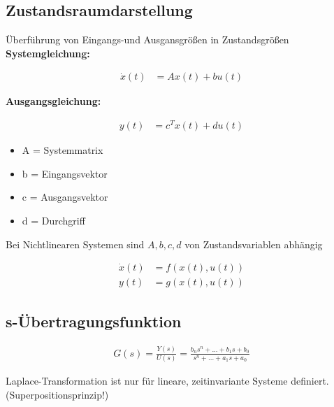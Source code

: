 \documentclass[10pt,a4paper]{article}
\begin{document}
  \subsection{Zustandsraumdarstellung}
  Überführung von Eingangs-und Ausgansgrößen in Zustandsgrößen \\
\textbf{Systemgleichung:}
  \begin{mdframed}[style=exercise]
    \begin{align}
        \dot{x}(t) &= Ax(t) + bu(t)
    \end{align}
  \end{mdframed}
\textbf{Ausgangsgleichung:}
  \begin{mdframed}[style=exercise]
    \begin{align}
        y(t) &= c^T x(t) + du(t)
    \end{align}
  \end{mdframed}
  \begin{itemize}
    \item A = Systemmatrix
    \item b = Eingangsvektor
    \item c = Ausgangsvektor
    \item d = Durchgriff
  \end{itemize}
  Bei Nichtlinearen Systemen sind $A,b,c,d$ von Zustandsvariablen abhängig
  \begin{mdframed}[style=exercise]
    \begin{align}
        \dot{x}(t) &= f(x(t),u(t)) \\
        y(t) &= g(x(t),u(t))
    \end{align}
  \end{mdframed}

  \subsection{s-Übertragungsfunktion}
  \begin{mdframed}[style=exercise]
    \begin{align}
        G(s)=\frac{Y(s)}{U(s)}= \frac{b_n s^{n}+...+b_1s+b_0 } {s^{n}+...+a_1s+a_0 }
    \end{align}
  \end{mdframed}
  Laplace-Transformation ist nur für lineare, zeitinvariante Systeme definiert. (Superpositionsprinzip!)
\end{document}
